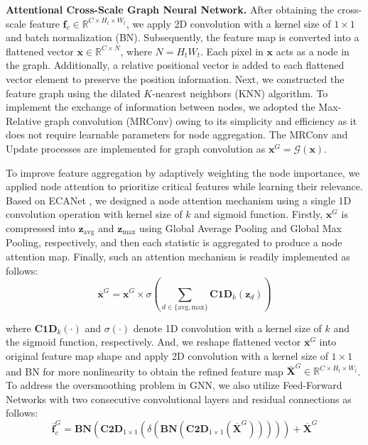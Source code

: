 \noindent \textbf{Attentional Cross-Scale Graph Neural Network.} After obtaining the cross-scale feature $\mathbf{f}_{c} \in \mathbb{R}^{C \times H_{t} \times W_{t}}$, we apply 2D convolution with a kernel size of $1 \times 1$ and batch normalization (BN). Subsequently, the feature map is converted into a flattened vector $\mathbf{x} \in \mathbb{R}^{C \times N}$, where $N = H_{t}W_{t}$. Each pixel in $\mathbf{x}$ acts as a node in the graph. Additionally, a relative positional vector is added to each flattened vector element to preserve the position information. Next, we constructed the feature graph using the dilated $K$-nearest neighbors (KNN) algorithm. To implement the exchange of information between nodes, we adopted the Max-Relative graph convolution (MRConv) \cite{li2019deepgcns} owing to its simplicity and efficiency as it does not require learnable parameters for node aggregation. The MRConv and Update processes are implemented for graph convolution as $\mathbf{x}^{G} = \mathcal{G} (\mathbf{x})$. 

\noindent To improve feature aggregation by adaptively weighting the node importance, we applied node attention to prioritize critical features while learning their relevance. Based on ECANet \cite{wang2020eca}, we designed a node attention mechanism using a single 1D convolution operation with kernel size of $k$ and sigmoid function. Firstly, $\mathbf{x}^{G}$ is compressed into $\mathbf{z}_{\text{avg}}$ and $\mathbf{z}_{\text{max}}$ using Global Average Pooling and Global Max Pooling, respectively, and then each statistic is aggregated to produce a node attention map. Finally, such an attention mechanism is readily implemented as follows:
\begin{equation}
    \overline{\mathbf{x}}^{G} = \mathbf{x}^{G} \times \sigma \left( \sum_{d \in \{ \text{avg}, \text{max} \}} \textbf{C1D}_{k} (\mathbf{z}_{d}) \right)
\end{equation}

\noindent where $\textbf{C1D}_{k} ( \cdot )$ and $\sigma( \cdot )$ denote 1D convolution with a kernel size of $k$ and the sigmoid function, respectively. And, we reshape flattened vector $\overline{\mathbf{x}}^{G}$ into original feature map shape and apply 2D convolution with a kernel size of $1 \times 1$ and BN for more nonlinearity to obtain the refined feature map $\overline{\mathbf{X}}^{G} \in \mathbb{R}^{C \times H_{t} \times W_{t}}$. To address the oversmoothing problem \cite{li2018deeper, oono2020graph} in GNN, we also utilize Feed-Forward Networks with two consecutive convolutional layers and residual connections as follows:
\begin{equation}
    \overline{\mathbf{f}}^{G}_{c} = \textbf{BN} (\textbf{C2D}_{1 \times 1} (\delta(\textbf{BN} (\textbf{C2D}_{1 \times 1} (\overline{\mathbf{X}}^{G}))))) + \overline{\mathbf{X}}^{G}
\end{equation}

